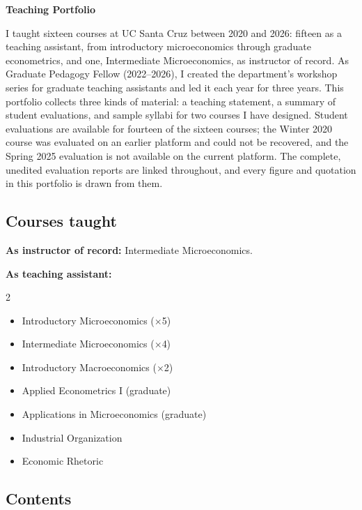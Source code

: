 \documentclass[letter,11pt]{article}
\begin{document}
\thispagestyle{firstpage}
\begin{center}
    \textbf{\large{Teaching Portfolio}}
\end{center}

I taught sixteen courses at UC Santa Cruz between 2020 and 2026: fifteen as a teaching assistant, from introductory microeconomics through graduate econometrics, and one, Intermediate Microeconomics, as instructor of record. As Graduate Pedagogy Fellow (2022--2026), I created the department's workshop series for graduate teaching assistants and led it each year for three years. This portfolio collects three kinds of material: a teaching statement, a summary of student evaluations, and sample syllabi for two courses I have designed. Student evaluations are available for fourteen of the sixteen courses; the Winter 2020 course was evaluated on an earlier platform and could not be recovered, and the Spring 2025 evaluation is not available on the current platform. The complete, unedited evaluation reports are linked throughout, and every figure and quotation in this portfolio is drawn from them.

\subsection*{Courses taught}

\textbf{As instructor of record:} Intermediate Microeconomics.

\textbf{As teaching assistant:}
{\setlength{\columnsep}{1.5em}
\begin{multicols}{2}
\begin{itemize}[nosep]
    \item Introductory Microeconomics ($\times$5)
    \item Intermediate Microeconomics ($\times$4)
    \item Introductory Macroeconomics ($\times$2)
    \item Applied Econometrics I (graduate)
    \item Applications in Microeconomics (graduate)
    \item Industrial Organization
    \item Economic Rhetoric
\end{itemize}
\end{multicols}}

\subsection*{Contents}
\end{document}
